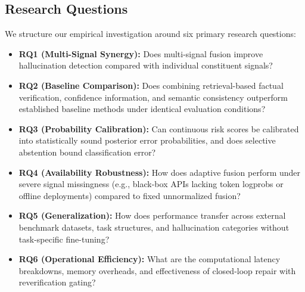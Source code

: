 \documentclass[conference]{IEEEtran}
\begin{document}
\subsection{Research Questions}
We structure our empirical investigation around six primary research questions:
\begin{itemize}
    \item \textbf{RQ1 (Multi-Signal Synergy):} Does multi-signal fusion improve hallucination detection compared with individual constituent signals?
    \item \textbf{RQ2 (Baseline Comparison):} Does combining retrieval-based factual verification, confidence information, and semantic consistency outperform established baseline methods under identical evaluation conditions?
    \item \textbf{RQ3 (Probability Calibration):} Can continuous risk scores be calibrated into statistically sound posterior error probabilities, and does selective abstention bound classification error?
    \item \textbf{RQ4 (Availability Robustness):} How does adaptive fusion perform under severe signal missingness (e.g., black-box APIs lacking token logprobs or offline deployments) compared to fixed unnormalized fusion?
    \item \textbf{RQ5 (Generalization):} How does performance transfer across external benchmark datasets, task structures, and hallucination categories without task-specific fine-tuning?
    \item \textbf{RQ6 (Operational Efficiency):} What are the computational latency breakdowns, memory overheads, and effectiveness of closed-loop repair with reverification gating?
\end{itemize}
\end{document}
